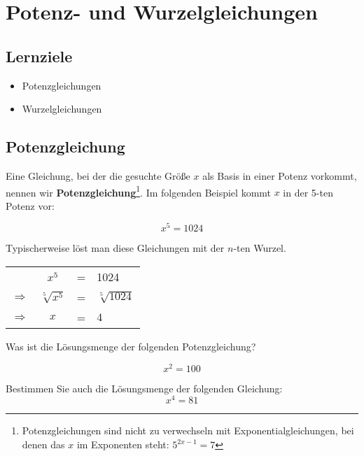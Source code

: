 
\section{Potenz- und Wurzelgleichungen}

\subsection*{Lernziele}

\begin{itemize}
\item Potenzgleichungen
\item Wurzelgleichungen
\end{itemize}
\newpage


\newpage


\subsection{Potenzgleichung}
Eine Gleichung, bei der die gesuchte Größe $x$ als Basis in einer Potenz
vorkommt, nennen wir
\textbf{Potenzgleichung}\footnote{Potenzgleichungen sind nicht zu
  verwechseln mit Exponentialgleichungen, bei denen das $x$ im
  Exponenten steht: $5^{2x-1}=7$}. Im folgenden Beispiel kommt $x$ in
der 5-ten Potenz vor:

$$x^5 = 1024$$

Typischerweise löst man diese Gleichungen mit der $n$-ten Wurzel.

\begin{tabular}{rccl}
  \             & $x^5$           &=& 1024             \\
  $\Rightarrow$ & $\sqrt[5]{x^5}$ &=& $\sqrt[5]{1024}$ \\
  $\Rightarrow$ & $x$             &=& $4$ 
\end{tabular}

Was ist die Lösungsmenge der folgenden Potenzgleichung?

$$x^2 = 100$$


Bestimmen Sie auch die Lösungsmenge der folgenden Gleichung:
$$x^4 = 81$$

